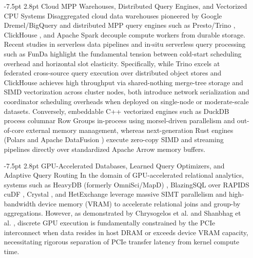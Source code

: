 \documentclass[10pt,a4paper]{article}
\makeatletter
\renewcommand\subsection{\@startsection{subsection}{2}{\z@}%
  {-7.5pt \@plus -2pt \@minus -1pt}%
  {2.8pt \@plus 1pt}%
  {\normalfont\normalsize\bfseries}}
\makeatother
\begin{document}
\subsection{Cloud MPP Warehouses, Distributed Query Engines, and Vectorized CPU Systems}
Disaggregated cloud data warehouses pioneered by Google Dremel/BigQuery \cite{melnik2010dremel, melnik2020dremel} and distributed MPP query engines such as Presto/Trino \cite{sethi2019presto}, ClickHouse \cite{schulze2024clickhouse}, and Apache Spark \cite{ahmed2020hibench} decouple compute workers from durable storage. Recent studies in serverless data pipelines \cite{shojaee2024serverless} and in-situ serverless query processing such as FunDa \cite{lounissi2025funda} highlight the fundamental tension between cold-start scheduling overhead and horizontal slot elasticity. Specifically, while Trino \cite{sethi2019presto} excels at federated cross-source query execution over distributed object stores and ClickHouse \cite{schulze2024clickhouse} achieves high throughput via shared-nothing merge-tree storage and SIMD vectorization across cluster nodes, both introduce network serialization and coordinator scheduling overheads when deployed on single-node or moderate-scale datasets. Conversely, embeddable C++ vectorized engines such as DuckDB \cite{raasveldt2019duckdb, kuiper2024duckdb_ooc} process columnar Row Groups in-process using morsel-driven parallelism and out-of-core external memory management, whereas next-generation Rust engines (Polars and Apache DataFusion \cite{lamb2024datafusion}) execute zero-copy SIMD and streaming pipelines directly over standardized Apache Arrow memory buffers.

\subsection{GPU-Accelerated Databases, Learned Query Optimizers, and Adaptive Query Routing}
In the domain of GPU-accelerated relational analytics, systems such as HeavyDB (formerly OmniSci/MapD) \cite{root2019mapd}, BlazingSQL over RAPIDS cuDF \cite{kim2022blazingsql}, Crystal \cite{shanbhag2020crystal}, and HetExchange \cite{chrysogelos2019hetexchange} leverage massive SIMT parallelism and high-bandwidth device memory (VRAM) to accelerate relational joins and group-by aggregations. However, as demonstrated by Chrysogelos et al. \cite{chrysogelos2019hetexchange} and Shanbhag et al. \cite{shanbhag2020crystal}, discrete GPU execution is fundamentally constrained by the PCIe interconnect when data resides in host DRAM or exceeds device VRAM capacity, necessitating rigorous separation of PCIe transfer latency from kernel compute time.
\end{document}
